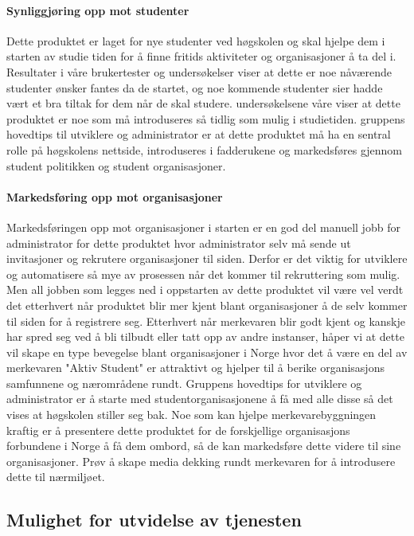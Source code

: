\paragraph{Synliggjøring opp mot studenter}

Dette produktet er laget for nye studenter ved høgskolen og skal hjelpe dem i starten av studie tiden for å finne fritids aktiviteter og organisasjoner å ta del i. Resultater i våre brukertester og undersøkelser viser at dette er noe nåværende studenter ønsker fantes da de startet, og noe kommende studenter sier hadde vært et bra tiltak for dem når de skal studere. 
undersøkelsene våre viser at dette produktet er noe som må introduseres så tidlig som mulig i studietiden. gruppens hovedtips til utviklere og administrator er at dette produktet må ha en sentral rolle på høgskolens nettside, introduseres i fadderukene og markedsføres gjennom student politikken og student organisasjoner.

\paragraph{Markedsføring opp mot organisasjoner}

Markedsføringen opp mot organisasjoner i starten er en god del manuell jobb for administrator for dette produktet hvor administrator selv må sende ut invitasjoner og rekrutere organisasjoner til siden. Derfor er det viktig for utviklere og automatisere så mye av prosessen når det kommer til rekruttering som mulig. Men all jobben som legges ned i oppstarten av dette produktet vil være vel verdt det etterhvert når produktet blir mer kjent blant organisasjoner å de selv kommer til siden for å registrere seg. Etterhvert når merkevaren blir godt kjent og kanskje har spred seg ved å bli tilbudt eller tatt opp av andre instanser, håper vi at dette vil skape en type bevegelse blant organisasjoner i Norge hvor det å være en del av merkevaren "Aktiv Student" er attraktivt og hjelper til å berike organisasjons samfunnene og nærområdene rundt. Gruppens hovedtips for utviklere og administrator er å starte med studentorganisasjonene å få med alle disse så det vises at høgskolen stiller seg bak. Noe som kan hjelpe merkevarebyggningen kraftig er å presentere dette produktet for de forskjellige organisasjons forbundene i Norge å få dem ombord, så de kan markedsføre dette videre til sine organisasjoner. Prøv å skape media dekking rundt merkevaren for å introdusere dette til nærmiljøet. 

\subsection{Mulighet for utvidelse av tjenesten}

